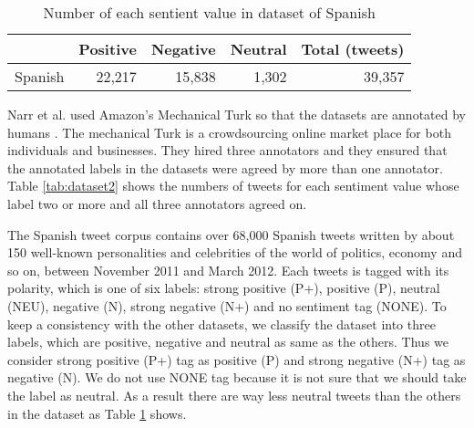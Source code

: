 \begin{table}[ht]
	\caption{Number of each sentient value in dataset of Spanish}
	\centering
	\begin{tabular}{|c|r|r|r|r|} \hline
	{} & Positive & Negative & Neutral & Total (tweets)\\ \hline
	Spanish & 22,217 & 15,838 & 1,302 & 39,357 \\ \hline
	\end{tabular}
	\label{tab:dataset_esp}
\end{table}


\begin{comment}
\begin{table}[ht]
	\caption{Number of dataset of each language}
	\centering
	\begin{tabular}{|c|r|} \hline
	Language & \# of dataset \\ \hline \hline
	English & 7,200  \\ \hline
	French & 1,797  \\ \hline
	German & 1,800  \\ \hline
	Spanish & 68,000  \\ \hline
	\end{tabular}
	\label{tab:dataset}
\end{table}
\end{comment}

Narr et al. used Amazon's Mechanical Turk \cite{mechanical_turk} so that the datasets are annotated by humans \cite{dataset}.
The mechanical Turk is a crowdsourcing online market place for both individuals and businesses.
They hired three annotators and they ensured that the annotated labels in the datasets were agreed by more than one annotator.
Table \ref{tab:dataset2} shows the numbers of tweets for each sentiment value whose label two or more and all three annotators agreed on.


The Spanish tweet corpus contains over 68,000 Spanish tweets written by about 150 well-known personalities and celebrities of the world of politics, economy and so on, between November 2011 and March 2012.
Each tweets is tagged with its polarity, which is one of six labels: strong positive (P+), positive (P), neutral (NEU), negative (N), strong negative (N+) and no sentiment tag (NONE).
To keep a consistency with the other datasets, we classify the dataset into three labels, which are positive, negative and neutral as same as the others.
Thus we consider strong positive (P+) tag as positive (P) and strong negative (N+) tag as negative (N).
We do not use NONE tag because it is not sure that we should take the label as neutral.
As a result there are way less neutral tweets than the others in the dataset as Table \ref{tab:dataset_esp} shows. 

